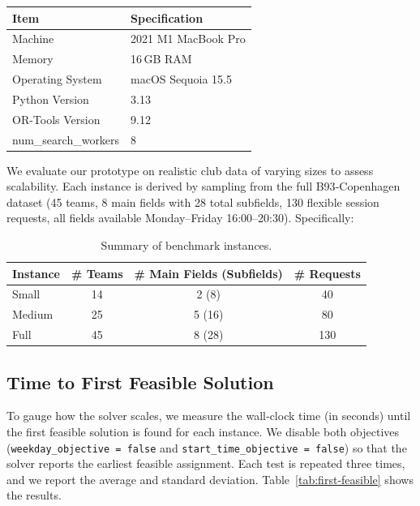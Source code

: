 \documentclass[12pt]{article}
\begin{document}
\begin{table}[h]
  \centering
  \def\arraystretch{1.3}
  \begin{tabular}{p{4cm} p{8cm}}
    \hline
    \textbf{Item} & \textbf{Specification} \\
    \hline
    Machine & 2021 M1 MacBook Pro \\
    Memory & 16\,GB RAM \\
    Operating System & macOS Sequoia 15.5 \\
    Python Version & 3.13 \\
    OR-Tools Version & 9.12 \\
    num\_search\_workers & 8 \\
    \hline
  \end{tabular}
\end{table}

We evaluate our prototype on realistic club data of varying sizes to assess scalability. Each instance is derived by sampling from the full B93‐Copenhagen dataset (45 teams, 8 main fields with 28 total subfields, 130 flexible session requests, all fields available Monday–Friday 16:00–20:30). Specifically:

\begin{table}[h]
  \centering
  \def\arraystretch{1.3}
  \begin{tabularx}{0.85\textwidth}{l  c  c  c}
    \hline
    \textbf{Instance} & \textbf{\# Teams} & \textbf{\# Main Fields (Subfields)} & \textbf{\# Requests} \\
    \hline
    Small    & 14 & 2 (8)  & 40  \\
    Medium   & 25 & 5 (16) & 80  \\
    Full     & 45 & 8 (28) & 130 \\
    \hline
  \end{tabularx}
  \caption{Summary of benchmark instances.}
  \label{tab:benchmark‐summary}
\end{table}

\subsection{Time to First Feasible Solution}
To gauge how the solver scales, we measure the wall‐clock time (in seconds) until the first feasible solution is found for each instance. We disable both objectives (\texttt{weekday\_objective = false} and \texttt{start\_time\_objective = false}) so that the solver reports the earliest feasible assignment. Each test is repeated three times, and we report the average and standard deviation. Table~\ref{tab:first‐feasible} shows the results.
\end{document}
